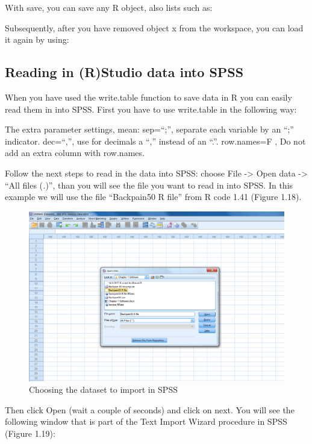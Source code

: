 \documentclass[]{book}
\theoremstyle{definition}
\theoremstyle{definition}
\theoremstyle{definition}
\theoremstyle{remark}
\begin{document}
With save, you can save any R object, also lists such as:

Subsequently, after you have removed object x from the workspace, you
can load it again by using:

\subsection{Reading in (R)Studio data into
SPSS}\label{reading-in-rstudio-data-into-spss}

When you have used the write.table function to save data in R you can
easily read them in into SPSS. First you have to use write.table in the
following way:

The extra parameter settings, mean: sep=``;'', separate each variable by
an ``;'' indicator. dec=``,'', use for decimals a ``,'' instead of an
``.''. row.names=F , Do not add an extra column with row.names.

Follow the next steps to read in the data into SPSS: choose File
-\textgreater{} Open data -\textgreater{} ``All files (\emph{.})'', than
you will see the file you want to read in into SPSS. In this example we
will use the file ``Backpain50 R file'' from R code 1.41 (Figure 1.18).

\begin{figure}

{\centering \includegraphics[width=0.9\linewidth]{images/fig1.18} 

}

\caption{Choosing the dataset to import in SPSS}\label{fig:fig18}
\end{figure}

Then click Open (wait a couple of seconds) and click on next. You will
see the following window that is part of the Text Import Wizard
procedure in SPSS (Figure 1.19):
\end{document}
